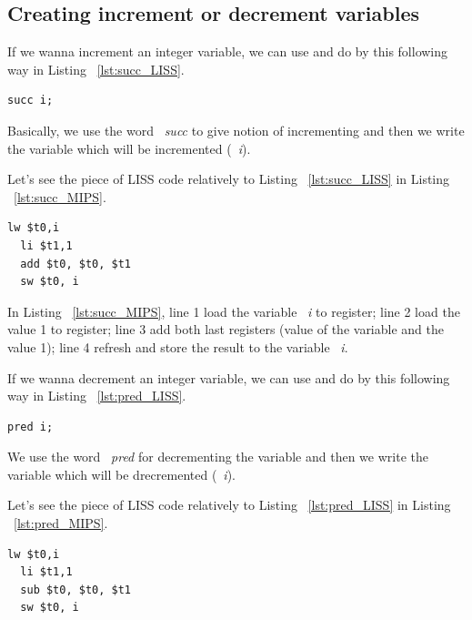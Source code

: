 \documentclass[
  oneside,
  11pt, a4paper,
  footinclude=true,
  headinclude=true,
  cleardoublepage=empty
]{scrbook}
\begin{document}
\subsection{Creating increment or decrement variables}

If we wanna increment an integer variable, we can use and do by this following way in Listing ~\ref{lst:succ_LISS}.

\begin{lstlisting}[caption={Increment variable in LISS},label={lst:succ_LISS}]
  succ i;
\end{lstlisting}

Basically, we use the word ~\textit{succ} to give notion of incrementing and then we write the variable which will be incremented (~\textit{i}).

Let's see the piece of LISS code relatively to Listing ~\ref{lst:succ_LISS} in Listing ~\ref{lst:succ_MIPS}.

\begin{lstlisting}[caption={Code generated for the LISS code in Listing ~\ref{lst:succ_LISS}},label={lst:succ_MIPS}]
  lw $t0,i		
  li $t1,1		
  add $t0, $t0, $t1	
  sw $t0, i		
\end{lstlisting}

In Listing ~\ref{lst:succ_MIPS}, line 1 load the variable ~\textit{i} to register; line 2 load the value 1 to register; line 3 add both last registers (value of the variable and the value 1); line 4 refresh and store the result to the variable ~\textit{i}.

If we wanna decrement an integer variable, we can use and do by this following way in Listing ~\ref{lst:pred_LISS}.

\begin{lstlisting}[caption={Decrement variable in LISS},label={lst:pred_LISS}]
  pred i;
\end{lstlisting}

We use the word ~\textit{pred} for decrementing the variable and then we write the variable which will be drecremented (~\textit{i}).

Let's see the piece of LISS code relatively to Listing ~\ref{lst:pred_LISS} in Listing ~\ref{lst:pred_MIPS}.

\begin{lstlisting}[caption={Code generated for the LISS code in Listing ~\ref{lst:pred_MIPS}},label={lst:pred_MIPS}] 
  lw $t0,i		
  li $t1,1		
  sub $t0, $t0, $t1	
  sw $t0, i		
\end{lstlisting}
\end{document}
